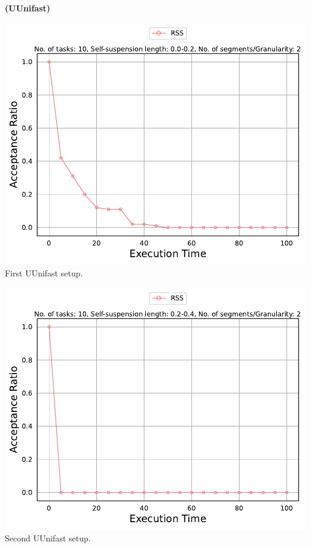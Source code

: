 \documentclass[]{article}
\begin{document}
	\begin{minipage}[t]{0.48\linewidth}
		\centering
		\textbf{(UUnifast)}
		\vspace{0.3cm}
		
		\includegraphics[width=\linewidth]{RSS[2][0.0-0.2][10].pdf}
		First UUnifast setup.
		\vspace{0.3cm}
		
		\includegraphics[width=\linewidth]{RSS[2][0.2-0.4][10].pdf}
		Second UUnifast setup.
		\vspace{0.3cm}
		

\end{minipage}
\end{document}

